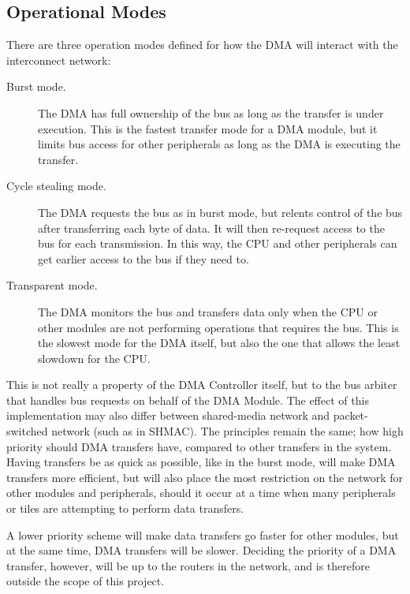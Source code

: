 \subsection{Operational Modes}
There are three operation modes defined for how the DMA will interact with the interconnect network:
\begin{description}
    \item[Burst mode.] \cite[p~876-877]{encyclopedia}
    The DMA has full ownership of the bus as long as the transfer is under execution.
    This is the fastest transfer mode for a DMA module, but it limits bus access for other
    peripherals as long as the DMA is executing the transfer.

    \item[Cycle stealing mode.] \cite[p~876-877]{encyclopedia}
    The DMA requests the bus as in burst mode, but relents control of the bus after transferring
    each byte of data. It will then re-request access to the bus for each transmission.
    In this way, the CPU and other peripherals can get earlier access to the bus if they need to.

    \item[Transparent mode.] \cite{dma-lecture}
    The DMA monitors the bus and transfers data only when the CPU or other modules are not performing operations that requires the bus.
    This is the slowest mode for the DMA itself, but also the one that allows the least slowdown for the CPU.
\end{description}

This is not really a property of the DMA Controller itself, but to the bus arbiter that handles bus requests on behalf of the DMA Module.
The effect of this implementation may also differ between shared-media network and packet-switched network (such as in SHMAC).
The principles remain the same; how high priority should DMA transfers have, compared to other transfers in the system. 
Having transfers be as quick as possible, like in the burst mode, will make DMA transfers more efficient, but will also place the most restriction on the network for other modules and peripherals, should it occur at a time when many peripherals or tiles are attempting to perform data transfers.

A lower priority scheme will make data transfers go faster for other modules, but at
the same time, DMA transfers will be slower. Deciding the priority of a DMA transfer,
however, will be up to the routers in the network,  and is therefore outside the scope of this project.

